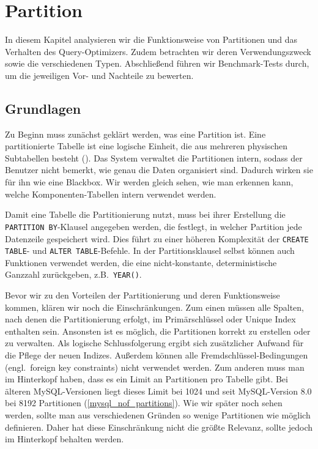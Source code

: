 
\chapter{Partition}\label{ch:partition}
In diesem Kapitel analysieren wir die Funktionsweise von Partitionen und das Verhalten des Query-Optimizers.
Zudem betrachten wir deren Verwendungszweck sowie die verschiedenen Typen.
Abschließend führen wir Benchmark-Tests durch, um die jeweiligen Vor- und Nachteile zu bewerten.

\section{Grundlagen}\label{sec:partition-grundlagen}
Zu Beginn muss zunächst geklärt werden, was eine Partition ist.
Eine partitionierte Tabelle ist eine logische Einheit, die aus mehreren physischen Subtabellen besteht (\cite[pp. 265--273]{schwartz2012high}).
Das System verwaltet die Partitionen intern, sodass der Benutzer nicht bemerkt, wie genau die Daten organisiert sind.
Dadurch wirken sie für ihn wie eine Blackbox.
Wir werden gleich sehen, wie man erkennen kann, welche Komponenten-Tabellen intern verwendet werden.

Damit eine Tabelle die Partitionierung nutzt, muss bei ihrer Erstellung die \texttt{PARTITION BY}-Klausel angegeben werden, die festlegt, in welcher Partition jede Datenzeile gespeichert wird.
Dies führt zu einer höheren Komplexität der \texttt{CREATE TABLE}- und \texttt{ALTER TABLE}-Befehle.
In der Partitionsklausel selbst können auch Funktionen verwendet werden, die eine nicht-konstante, deterministische Ganzzahl zurückgeben, z.B.\ \texttt{YEAR()}.

Bevor wir zu den Vorteilen der Partitionierung und deren Funktionsweise kommen, klären wir noch die Einschränkungen.
Zum einen müssen alle Spalten, nach denen die Partitionierung erfolgt, im Primärschlüssel oder Unique Index enthalten sein.
Ansonsten ist es möglich, die Partitionen korrekt zu erstellen oder zu verwalten.
Als logische Schlussfolgerung ergibt sich zusätzlicher Aufwand für die Pflege der neuen Indizes.
Außerdem können alle Fremdschlüssel-Bedingungen (engl.\ foreign key constraints) nicht verwendet werden.
Zum anderen muss man im Hinterkopf haben, dass es ein Limit an Partitionen pro Tabelle gibt.
Bei älteren MySQL-Versionen liegt dieses Limit bei 1024 und seit MySQL-Version 8.0 bei 8192 Partitionen (\ref{mysql_nof_partitions}).
Wie wir später noch sehen werden, sollte man aus verschiedenen Gründen so wenige Partitionen wie möglich definieren.
Daher hat diese Einschränkung nicht die größte Relevanz, sollte jedoch im Hinterkopf behalten werden.

